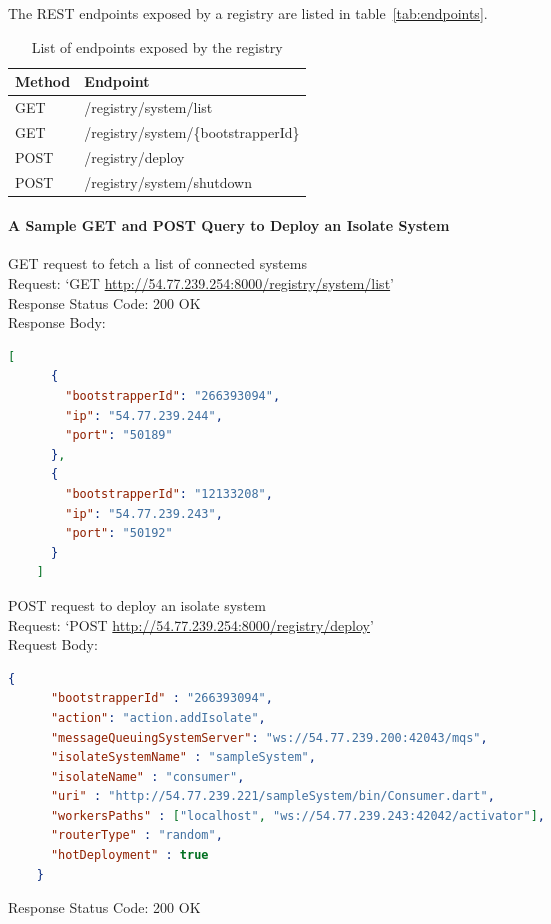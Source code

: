   The REST endpoints exposed by a registry are listed in table~\autoref{tab:endpoints}.
  \begin{table}[H]
    \caption[Endpoints exposed by the registry]{List of endpoints exposed by the registry}\label{tab:endpoints}
    \centering
    \begin{tabular}{l l}
      \toprule
        Method  & Endpoint \\
      \midrule
        GET &  /registry/system/list\\
        GET & /registry/system/\{bootstrapperId\} \\
        POST & /registry/deploy \\
        POST & /registry/system/shutdown \\
      \bottomrule
    \end{tabular}
  \end{table}

\paragraph{A Sample GET and POST Query to Deploy an Isolate System}
\begin{description}
  \item{GET request to fetch a list of connected systems}\\
  Request: ‘GET \url{http://54.77.239.254:8000/registry/system/list}’\\
  Response Status Code: 200 OK\\
  Response Body:
  \begin{lstlisting}[language=json,firstnumber=1]
    [
      {
        "bootstrapperId": "266393094",
        "ip": "54.77.239.244",
        "port": "50189"
      },
      {
        "bootstrapperId": "12133208",
        "ip": "54.77.239.243",
        "port": "50192"
      }
    ]
  \end{lstlisting}

  \item{POST request to deploy an isolate system}\\
  Request: ‘POST \url{http://54.77.239.254:8000/registry/deploy}’\\
  Request Body:
  \begin{lstlisting}[language=json,firstnumber=1]
    {
      "bootstrapperId" : "266393094",
      "action": "action.addIsolate",
      "messageQueuingSystemServer": "ws://54.77.239.200:42043/mqs",
      "isolateSystemName" : "sampleSystem",
      "isolateName" : "consumer",
      "uri" : "http://54.77.239.221/sampleSystem/bin/Consumer.dart",
      "workersPaths" : ["localhost", "ws://54.77.239.243:42042/activator"],
      "routerType" : "random",
      "hotDeployment" : true
    }
  \end{lstlisting}
  Response Status Code: 200 OK
\end{description}

